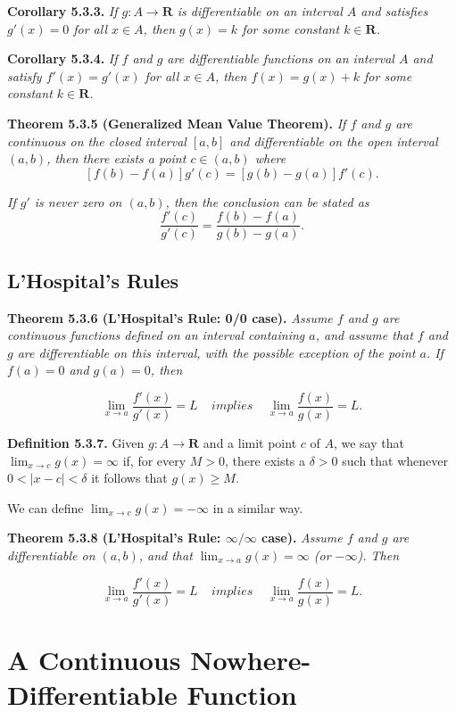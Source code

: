 \documentclass[12pt]{report}
\newcommand{\R}{\textbf{R}}
\begin{document}
\noindent \textbf{Corollary 5.3.3.} \textit{If $g:A\rightarrow\R$ is differentiable on an interval $A$ and satisfies $g'(x)=0$ for all $x\in A$, then $g(x)=k$ for some constant $k\in\R$.}
\bigskip

\noindent \textbf{Corollary 5.3.4.} \textit{If $f$ and $g$ are differentiable functions on an interval $A$ and satisfy $f'(x)=g'(x)$ for all $x\in A$, then $f(x)=g(x)+k$ for some constant $k\in\R$.}
\bigskip

\noindent \textbf{Theorem 5.3.5 (Generalized Mean Value Theorem).} \textit{If $f$ and $g$ are continuous on the closed interval $[a,b]$ and differentiable on the open interval $(a,b)$, then there exists a point $c\in(a,b)$ where}
\[[f(b)-f(a)]g'(c)=[g(b)-g(a)]f'(c).\]

\noindent \textit{If $g'$ is never zero on $(a,b)$, then the conclusion can be stated as}
\[\frac{f'(c)}{g'(c)}=\frac{f(b)-f(a)}{g(b)-g(a)}.\]

\subsection*{L'Hospital's Rules}

\noindent \textbf{Theorem 5.3.6 (L'Hospital's Rule: 0/0 case).} \textit{Assume $f$ and $g$ are continuous functions defined on an interval containing $a$, and assume that $f$ and $g$ are differentiable on this interval, with the possible exception of the point $a$.  If $f(a)=0$ and $g(a)=0$, then}

\[\lim_{x\rightarrow a}\frac{f'(x)}{g'(x)}=L\ \ \ \ \ implies\ \ \ \ \ \lim_{x\rightarrow a}\frac{f(x)}{g(x)}=L.\]
\bigskip

\noindent \textbf{Definition 5.3.7.} Given $g:A\rightarrow\R$ and a limit point $c$ of $A$, we say that $\lim_{x\rightarrow c}g(x)=\infty$ if, for every $M>0$, there exists a $\delta>0$ such that whenever $0<|x-c|<\delta$ it follows that $g(x)\geq M$.

We can define $\lim_{x\rightarrow c}g(x)=-\infty$ in a similar way.
\bigskip

\noindent \textbf{Theorem 5.3.8 (L'Hospital's Rule: $\infty/\infty$ case).} \textit{Assume $f$ and $g$ are differentiable on $(a,b)$, and that $\lim_{x\rightarrow a}g(x)=\infty$ (or $-\infty$). Then}

\[\lim_{x\rightarrow a}\frac{f'(x)}{g'(x)}=L\ \ \ \ \ implies\ \ \ \ \ \lim_{x\rightarrow a}\frac{f(x)}{g(x)}=L.\]
\bigskip

\section{A Continuous Nowhere-Differentiable Function}
\end{document}
